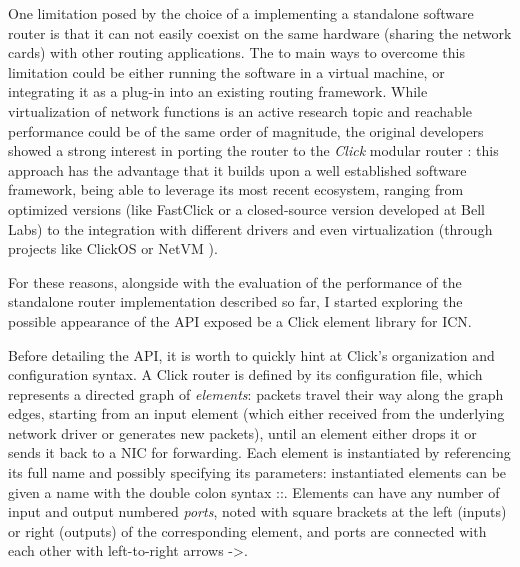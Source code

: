 \documentclass[11pt,a4paper,twoside,titlepage,openany]{book}
\newcommand{\mono}[1]{{\footnotesize \ttfamily #1}}
\begin{document}
One limitation posed by the choice of a implementing a standalone software router is that it can not easily coexist on the same hardware (sharing the network cards) with other routing applications. The to main ways to overcome this limitation could be either running the software in a virtual machine, or integrating it as a plug-in into an existing routing framework. While virtualization of network functions is an active research topic and reachable performance could be of the same order of magnitude, the original developers showed a strong interest in porting the router to the \emph{Click} modular router \cite{click}: this approach has the advantage that it builds upon a well established software framework, being able to leverage its most recent ecosystem, ranging from optimized versions (like FastClick \cite{fastclick} or a closed-source version developed at Bell Labs) to the integration with different drivers and even virtualization (through projects like ClickOS \cite{clickos} or NetVM \cite{netvm}).

For these reasons, alongside with the evaluation of the performance of the standalone router implementation described so far, I started exploring the possible appearance of the API exposed be a Click element library for ICN.

Before detailing the API, it is worth to quickly hint at Click's organization and configuration syntax. A Click router is defined by its configuration file, which represents a directed graph of \emph{elements}: packets travel their way along the graph edges, starting from an input element (which either received from the underlying network driver or generates new packets), until an element either drops it or sends it back to a NIC for forwarding. Each element is instantiated by referencing its full name and possibly specifying its parameters: instantiated elements can be given a name with the double colon syntax \mono{::}. Elements can have any number of input and output numbered \emph{ports}, noted with square brackets at the left (inputs) or right (outputs) of the corresponding element, and ports are connected with each other with left-to-right arrows \mono{->}.
\end{document}
